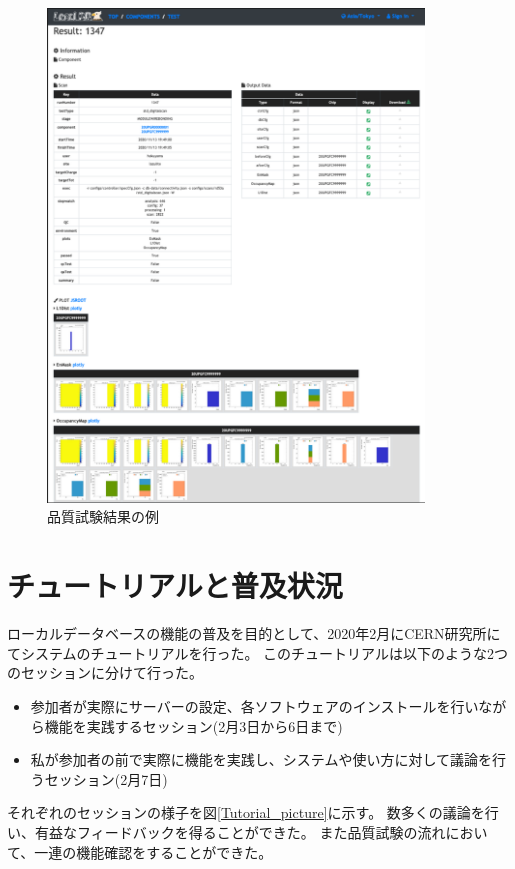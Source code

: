 \begin{figure}[bpt]\centering
\includegraphics[width=10cm]{viewer_result}
\caption[品質試験結果の例]{品質試験結果の例}
\label{viewer_result}
\end{figure}

\newpage
\section{チュートリアルと普及状況}
ローカルデータベースの機能の普及を目的として、2020年2月にCERN研究所にてシステムのチュートリアルを行った。
このチュートリアルは以下のような2つのセッションに分けて行った。

\begin{itemize}
  \item 参加者が実際にサーバーの設定、各ソフトウェアのインストールを行いながら機能を実践するセッション(2月3日から6日まで)
  \item 私が参加者の前で実際に機能を実践し、システムや使い方に対して議論を行うセッション(2月7日)
\end{itemize}

それぞれのセッションの様子を図\ref{Tutorial_picture}に示す。
数多くの議論を行い、有益なフィードバックを得ることができた。
また品質試験の流れにおいて、一連の機能確認をすることができた。

